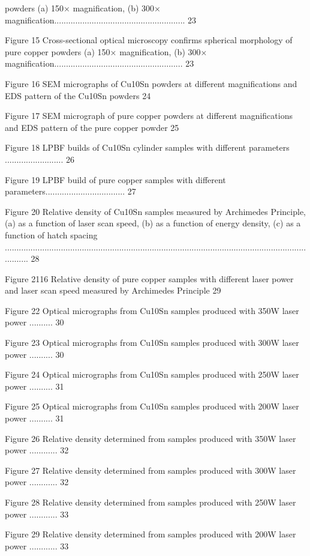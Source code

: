 \documentclass[10pt]{article}
\begin{document}
powders (a) 150× magnification, (b) 300× magnification........................................................ 23

Figure 15 Cross-sectional optical microscopy confirms spherical morphology of pure copper powders (a) 150× magnification, (b) 300× magnification....................................................... 23

Figure 16 SEM micrographs of Cu10Sn powders at different magnifications and EDS pattern of the Cu10Sn powders 24

Figure 17 SEM micrograph of pure copper powders at different magnifications and EDS pattern of the pure copper powder 25

Figure 18 LPBF builds of Cu10Sn cylinder samples with different parameters ......................... 26

Figure 19 LPBF build of pure copper samples with different parameters.................................. 27

Figure 20 Relative density of Cu10Sn samples measured by Archimedes Principle, (a) as a function of laser scan speed, (b) as a function of energy density, (c) as a function of hatch spacing ........................................................................................................................................... 28

Figure 2116 Relative density of pure copper samples with different laser power and laser scan speed measured by Archimedes Principle 29

Figure 22 Optical micrographs from Cu10Sn samples produced with 350W laser power .......... 30

Figure 23 Optical micrographs from Cu10Sn samples produced with 300W laser power .......... 30

Figure 24 Optical micrographs from Cu10Sn samples produced with 250W laser power .......... 31

Figure 25 Optical micrographs from Cu10Sn samples produced with 200W laser power .......... 31

Figure 26 Relative density determined from samples produced with 350W laser power ............ 32

Figure 27 Relative density determined from samples produced with 300W laser power ............ 32

Figure 28 Relative density determined from samples produced with 250W laser power ............ 33

Figure 29 Relative density determined from samples produced with 200W laser power ............ 33
\end{document}
